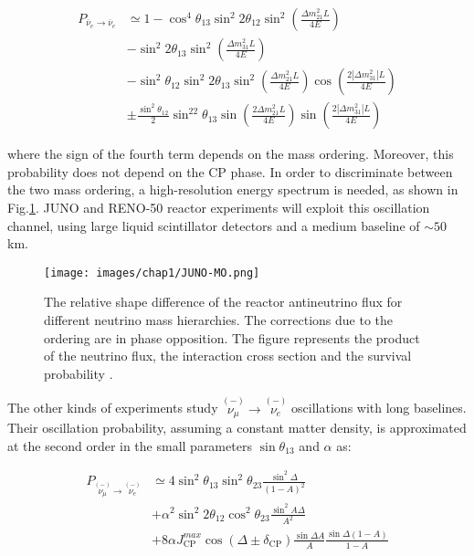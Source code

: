 \begin{equation}
    \begin{aligned}
    P_{\overline{\nu}_e \rightarrow \overline{\nu}_e} & \simeq 1- \cos^4 \theta_{13} \sin^2 2\theta_{12} \sin^2\left(\frac{\Delta m^2_{21}L}{4E}\right)\\ & -\sin^2 2\theta_{13}\sin^2\left(\frac{\Delta m^2_{31}L}{4E}\right)\\ & -\sin^2\theta_{12}\sin^2 2\theta_{13}\sin^2\left(\frac{\Delta m^2_{21}L}{4E}\right)\cos\left(\frac{2|\Delta m^2_{31}|L}{4E}\right)\\ & \pm \frac{\sin^2\theta_{12}}{2}\sin^22\theta_{13}\sin\left(\frac{2\Delta m^2_{21}L}{4E}\right)\sin\left(\frac{2|\Delta m^2_{31}|L}{4E}\right)
    \end{aligned}
\end{equation}

where the sign of the fourth term depends on the mass ordering. Moreover, this probability does not depend on the CP phase. In order to discriminate between the two mass ordering, a high-resolution energy spectrum is needed, as shown in Fig.\ref{fig:JUNO-MO}.
JUNO and RENO-50 reactor experiments will exploit this oscillation channel, using large liquid scintillator detectors and a medium baseline of $\sim 50$ km.

\begin{figure}
    \centering
    \texttt{[image: images/chap1/JUNO-MO.png]}
    \caption{The relative shape difference of the reactor antineutrino flux for different neutrino mass hierarchies. The corrections due to the ordering are in phase opposition. The figure represents the product of the neutrino flux, the interaction cross section and the survival probability \cite{JUNO-MO}.}
    \label{fig:JUNO-MO}
\end{figure}

The other kinds of experiments study $\overset{(-)}{\nu_\mu} \rightarrow \overset{(-)}{\nu_e}$ oscillations with long baselines. Their oscillation probability, assuming a constant matter density, is approximated at the second order in the small parameters $\sin \theta_{13}$ and $\alpha$ as: 

\begin{equation}
    \begin{aligned}
    P_{\overset{(-)}{\nu_\mu} \rightarrow \overset{(-)}{\nu_e}} & \simeq 4\sin^2 \theta_{13} \sin^2 \theta_{23} \frac{\sin^2\Delta}{(1-A)^2}\\ & +\alpha^2\sin^2 2\theta_{12}\cos^2\theta_{23}\frac{\sin^2 A\Delta}{A^2}\\ & +8\alpha J^{max}_{\text{CP}}\cos(\Delta \pm \delta_{\text{CP}})\frac{\sin \Delta A}{A}\frac{\sin \Delta (1-A)}{1-A}
    \end{aligned}
\end{equation}

